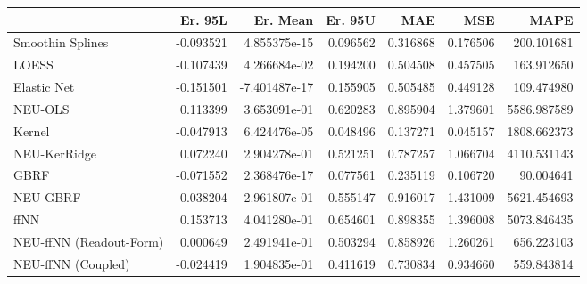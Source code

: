 \begin{tabular}{lrrrrrr}
\toprule
{} &   Er. 95L &      Er. Mean &   Er. 95U &       MAE &       MSE &         MAPE \\
\midrule
Smoothin Splines        & -0.093521 &  4.855375e-15 &  0.096562 &  0.316868 &  0.176506 &   200.101681 \\
LOESS                   & -0.107439 &  4.266684e-02 &  0.194200 &  0.504508 &  0.457505 &   163.912650 \\
Elastic Net             & -0.151501 & -7.401487e-17 &  0.155905 &  0.505485 &  0.449128 &   109.474980 \\
NEU-OLS                 &  0.113399 &  3.653091e-01 &  0.620283 &  0.895904 &  1.379601 &  5586.987589 \\
Kernel                  & -0.047913 &  6.424476e-05 &  0.048496 &  0.137271 &  0.045157 &  1808.662373 \\
NEU-KerRidge            &  0.072240 &  2.904278e-01 &  0.521251 &  0.787257 &  1.066704 &  4110.531143 \\
GBRF                    & -0.071552 &  2.368476e-17 &  0.077561 &  0.235119 &  0.106720 &    90.004641 \\
NEU-GBRF                &  0.038204 &  2.961807e-01 &  0.555147 &  0.916017 &  1.431009 &  5621.454693 \\
ffNN                    &  0.153713 &  4.041280e-01 &  0.654601 &  0.898355 &  1.396008 &  5073.846435 \\
NEU-ffNN (Readout-Form) &  0.000649 &  2.491941e-01 &  0.503294 &  0.858926 &  1.260261 &   656.223103 \\
NEU-ffNN (Coupled)      & -0.024419 &  1.904835e-01 &  0.411619 &  0.730834 &  0.934660 &   559.843814 \\
\bottomrule
\end{tabular}
